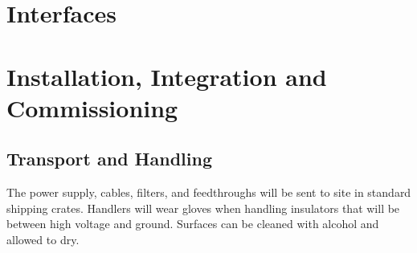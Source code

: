 \section{Interfaces}
\label{sec:fddp-hv-intfc}
%
%
%
%
%
%
%
%
%
%
%
%
\section{Installation, Integration and Commissioning}
\label{sec:fddp-hv-install}

\subsection{Transport and Handling}
\label{sec:fddp-hv-install-transport}

The power supply, cables, filters, and feedthroughs will be sent to site in standard shipping crates.  Handlers will wear gloves when handling insulators that will be between high voltage and ground.  Surfaces can be cleaned with alcohol and allowed to dry.

